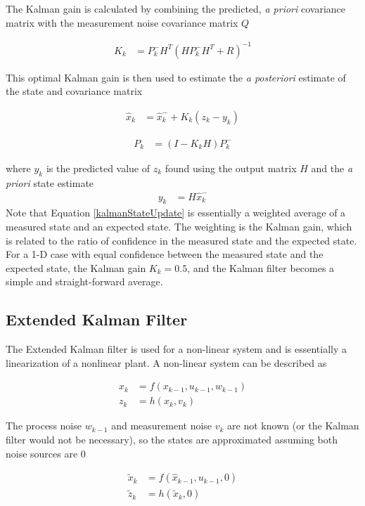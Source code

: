 \documentclass[12pt]{ucthesis}
\begin{document}
The Kalman gain is calculated by combining the predicted, \textit{a priori} covariance matrix with the measurement noise covariance matrix $Q$

\begin{align}
K_k &=P^-_kH^T(HP^-_kH^T + R)^{-1}
\end{align}

This optimal Kalman gain is then used to estimate the \textit{a posteriori} estimate of the state and covariance matrix

\begin{align}
\label{kalmanStateUpdate}
\hat{x}_k &=\hat{x}^-_k+K_k(z_k-y_k)
\end{align}

\begin{align}
P_k &= (I-K_kH)P^-_k
\end{align}

where $y_k$ is the predicted value of $z_k$ found using the output matrix $H$ and the \textit{a priori} state estimate
\begin{align}
y_k &= H\hat{x}^-_k
\end{align}
Note that Equation \ref{kalmanStateUpdate} is essentially a weighted average of a measured state and an expected state. The weighting is the Kalman gain, which is related to the ratio of confidence in the measured state and the expected state. For a 1-D case with equal confidence between the measured state and the expected state, the Kalman gain $K_k = 0.5$, and the Kalman filter becomes a simple and straight-forward average.


\subsection{Extended Kalman Filter}
\label{EKFTheory}
The Extended Kalman filter is used for a non-linear system and is essentially a linearization of a nonlinear plant. A non-linear system can be described as \cite{welch1995introduction}

\begin{align}
x_k &= f(x_{k-1},u_{k-1},w_{k-1})\\
z_k &= h(x_k,v_k)
\end{align}

The process noise $w_{k-1}$ and measurement noise $v_k$ are not known (or the Kalman filter would not be necessary), so the states are approximated assuming both noise sources are 0

\begin{align}
\tilde{x}_k &= f(\hat{x}_{k-1},u_{k-1},0)\\
\tilde{z}_k &= h(\tilde{x}_k,0)
\end{align}
\end{document}
